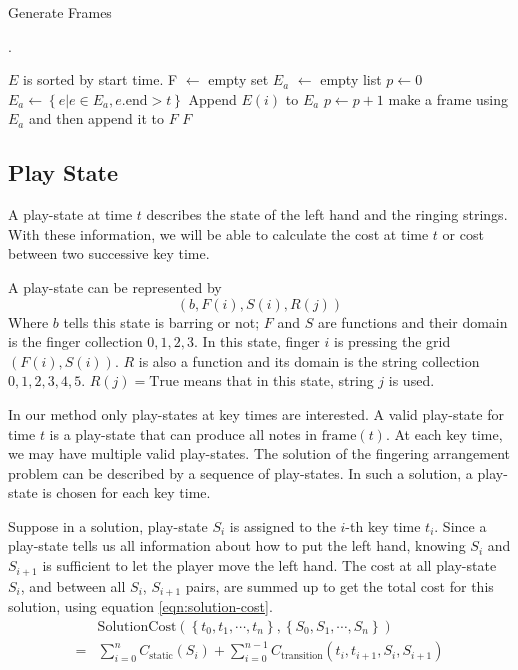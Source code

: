 \begin{algorithm}[h]
    \caption{Generate Frames} \label{algo:gen-frames}.
    \begin{algorithmic}
         
            \Require $E$ is sorted by start time.
            \State F $\gets$ empty set 
            \State $E_a$ $\gets$ empty list 
            \State $p \gets 0$
                \State $E_a \gets \left\{e | e \in E_a, e.\mathrm{end} > t \right\}$
                    \State Append $E(i)$ to $E_a$
                    \State $p \gets p + 1$
                \EndWhile
            \EndFor
            \State make a frame using $E_a$ and then append it to $F$
            \State \Return $F$
        \EndFunction

    \end{algorithmic}
\end{algorithm}

\subsection{Play State}
A play-state at time $t$ describes the state of the left hand and the ringing strings. With these information, we will be able to calculate the cost at time $t$ or cost between two successive key time.

A play-state can be represented by \[ (b, F(i), S(i), R(j)) \] Where $b$ tells this state is barring or not; $F$ and $S$ are functions and their domain is the finger collection ${0, 1, 2, 3}$. In this state, finger $i$ is pressing the grid $(F(i), S(i))$. $R$ is also a function and its domain is the string collection ${0, 1, 2, 3, 4, 5}$. $R(j) = \mathrm{True}$ means that in this state, string $j$ is used.

In our method only play-states at key times are interested. 
A valid play-state for time $t$ is  a play-state that can produce all notes in $\mathrm{frame}(t)$. At each key time, we may have multiple valid play-states.  The solution of the fingering arrangement problem can be described by a sequence of play-states. In such a solution, a play-state is chosen for each key time. 

Suppose in a solution, play-state $S_i$ is assigned to the $i$-th key time $t_i$. Since a play-state tells us all information about how to put the left hand, knowing $S_i$ and $S_{i+1}$ is sufficient to let the player move the left hand. The cost at all play-state $S_i$, and between all $S_i$, $S_{i+1}$ pairs, are summed up to get the total cost for this solution, using equation \ref{eqn:solution-cost}.
\begin{eqnarray}
    & \mathrm{SolutionCost}(
        \left\{t_0, t_1, \cdots, t_n\right\}, \left\{S_0, S_1, \cdots, S_n\right\}
    )  \nonumber\\
    =& \sum_{i = 0}^n C_{\mathrm{static}}(S_i)
    + \sum_{i = 0}^{n - 1} C_{\mathrm{transition}}(t_i, t_{i+1}, S_i, S_{i+1})
    \label{eqn:solution-cost}
\end{eqnarray}

